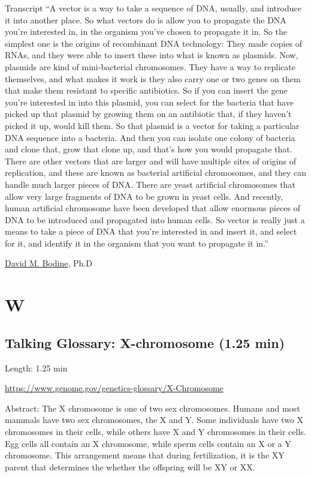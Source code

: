 \documentclass[
]{book}
\begin{document}
Transcript
``A vector is a way to take a sequence of DNA, usually, and introduce it into another place. So what vectors do is allow you to propagate the DNA you're interested in, in the organism you've chosen to propagate it in. So the simplest one is the origins of recombinant DNA technology: They made copies of RNAs, and they were able to insert these into what is known as plasmids. Now, plasmids are kind of mini-bacterial chromosomes. They have a way to replicate themselves, and what makes it work is they also carry one or two genes on them that make them resistant to specific antibiotics. So if you can insert the gene you're interested in into this plasmid, you can select for the bacteria that have picked up that plasmid by growing them on an antibiotic that, if they haven't picked it up, would kill them. So that plasmid is a vector for taking a particular DNA sequence into a bacteria. And then you can isolate one colony of bacteria and clone that, grow that clone up, and that's how you would propagate that. There are other vectors that are larger and will have multiple sites of origins of replication, and these are known as bacterial artificial chromosomes, and they can handle much larger pieces of DNA. There are yeast artificial chromosomes that allow very large fragments of DNA to be grown in yeast cells. And recently, human artificial chromosome have been developed that allow enormous pieces of DNA to be introduced and propagated into human cells. So vector is really just a means to take a piece of DNA that you're interested in and insert it, and select for it, and identify it in the organism that you want to propagate it in.''

\href{https://www.genome.gov/staff/David-M-Bodine-PhD}{David M. Bodine}, Ph.D

\hypertarget{w}{%
\chapter{W}\label{w}}

\hypertarget{talking-glossary-x-chromosome-1.25-min}{%
\section{Talking Glossary: X-chromosome (1.25 min)}\label{talking-glossary-x-chromosome-1.25-min}}

Length: 1.25 min

\url{https://www.genome.gov/genetics-glossary/X-Chromosome}

Abstract: The X chromosome is one of two sex chromosomes. Humans and most mammals have two sex chromosomes, the X and Y. Some individuals have two X chromosomes in their cells, while others have X and Y chromosomes in their cells. Egg cells all contain an X chromosome, while sperm cells contain an X or a Y chromosome. This arrangement means that during fertilization, it is the XY parent that determines the whether the offspring will be XY or XX.
\end{document}
